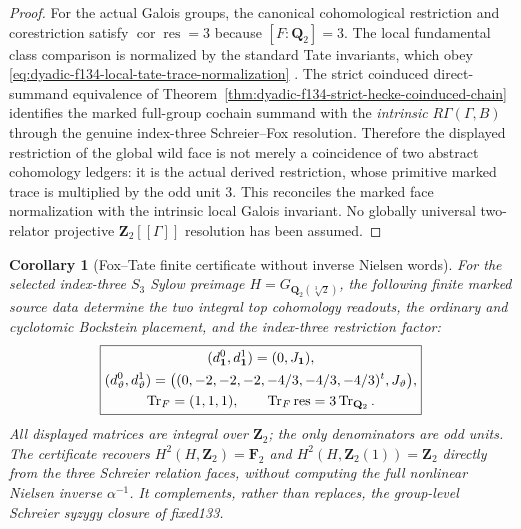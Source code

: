 \documentclass[11pt]{article}
\newtheorem{corollary}[theorem]{Corollary}
\theoremstyle{definition}
\begin{document}
\begin{proof}
For the actual
Galois groups,
the canonical
cohomological
restriction and
corestriction
satisfy
$\operatorname{cor}
\operatorname{res}=3$
because $[F:\mathbf Q_2]=3$.
The local
fundamental
class comparison
is normalized
by the standard
Tate invariants,
which obey
\eqref{eq:dyadic-f134-local-tate-trace-normalization}
\cite{NSW}.
The strict coinduced
direct-summand
equivalence of
Theorem~\ref{thm:dyadic-f134-strict-hecke-coinduced-chain}
identifies the
marked full-group
cochain summand
with the
\emph{intrinsic}
$R\Gamma(\Gamma,B)$
through the
genuine
index-three
Schreier--Fox
resolution.
Therefore the
displayed restriction
of the global
wild face is
not merely a
coincidence of
two abstract
cohomology ledgers:
it is the
actual derived
restriction,
whose primitive
marked trace
is multiplied
by the odd
unit $3$.
This reconciles
the marked face
normalization
with the
intrinsic local
Galois invariant.
No globally
universal
two-relator
projective
$\mathbf Z_2[[\Gamma]]$
resolution
has been assumed.
\end{proof}

\begin{corollary}[Fox--Tate finite certificate without inverse Nielsen words]
\label{cor:dyadic-f134-primitive-trace-certificate}
For the selected
index-three
$S_3$ Sylow
preimage
$H=G_{\mathbf Q_2(\sqrt[3]2)}$,
the following
finite marked
source data
determine the
two integral
top cohomology
readouts,
the ordinary
and cyclotomic
Bockstein
placement, and
the index-three
restriction
factor:
\begin{equation}\label{eq:dyadic-f134-final-trace-certificate}
\boxed{
\begin{gathered}
(d_{\bf1}^0,d_{\bf1}^1)
=(0,J_{\bf1}),\\
(d_{\vartheta}^0,d_{\vartheta}^1)
=\bigl(
(0,-2,-2,-2,-4/3,-4/3,-4/3)^t,
J_{\vartheta}\bigr),\\
\operatorname{Tr}_F=(1,1,1),
\qquad
\operatorname{Tr}_F\operatorname{res}
=3\operatorname{Tr}_{\mathbf Q_2}.
\end{gathered}}
\end{equation}
All displayed
matrices are
integral over
$\mathbf Z_2$;
the only
denominators are
odd units.
The certificate
recovers
$H^2(H,\mathbf Z_2)
=\mathbf F_2$
and
$H^2(H,\mathbf Z_2(1))
=\mathbf Z_2$
\emph{directly}
from the three
Schreier relation
faces, without
computing the
full nonlinear
Nielsen inverse
$\alpha^{-1}$.
It complements,
rather than
replaces, the
group-level
Schreier
syzygy closure
of fixed133.
\end{corollary}
\end{document}
